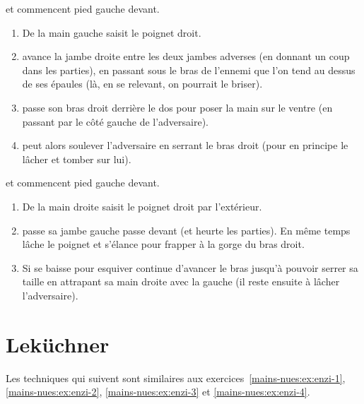 \begin{technique}

\A et \D commencent pied gauche devant.

\begin{enumerate}
	\item De la main gauche saisit \A le poignet droit.
	
	\item \A avance la jambe droite entre les deux jambes adverses (en donnant un coup dans les parties), en passant sous le bras de l'ennemi que l'on tend au dessus de ses épaules (là, en se relevant, on pourrait le briser).
	
	\item \A passe son bras droit derrière le dos pour poser la main sur le ventre (en passant par le côté gauche de l'adversaire).
	
	\item \A peut alors soulever l'adversaire en serrant le bras droit (pour en principe le lâcher et tomber sur lui).
\end{enumerate}
\end{technique}


\begin{technique}

\A et \D commencent pied gauche devant.

\begin{enumerate}
	\item De la main droite \A saisit le poignet droit par l'extérieur.
	
	\item \A passe sa jambe gauche passe devant (et heurte les parties).
	En même temps \A lâche le poignet et s'élance pour frapper \D à la gorge du bras droit.
	
	\item Si \D se baisse pour esquiver \A continue d'avancer le bras jusqu'à pouvoir serrer sa taille en attrapant sa main droite avec la gauche (il reste ensuite à lâcher l'adversaire).
\end{enumerate}
\end{technique}


\section{Leküchner}
\label{sec:messer:lekuchner}


Les techniques qui suivent sont similaires aux exercices~\ref{mains-nues:ex:enzi-1}, \ref{mains-nues:ex:enzi-2}, \ref{mains-nues:ex:enzi-3} et \ref{mains-nues:ex:enzi-4}.


